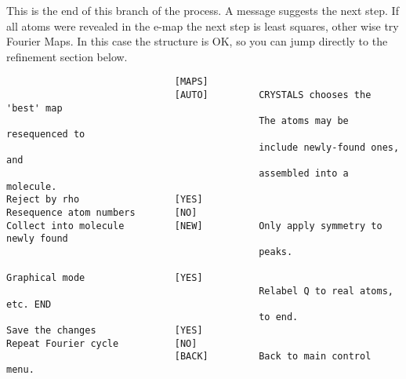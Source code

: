 \documentclass[10pt,a4paper]{report}
\begin{document}
This is the end of this branch of the process. A message suggests the next step.
If all atoms were revealed in the e-map the next step is least squares, other
wise try Fourier Maps. In this case the structure is OK, so you can jump
directly to the refinement section below.
\small\begin{verbatim}
                              [MAPS]
                              [AUTO]         CRYSTALS chooses the 'best' map
                                             The atoms may be resequenced to
                                             include newly-found ones, and
                                             assembled into a molecule.
Reject by rho                 [YES]
Resequence atom numbers       [NO]
Collect into molecule         [NEW]          Only apply symmetry to newly found
                                             peaks.

Graphical mode                [YES]
                                             Relabel Q to real atoms, etc. END
                                             to end.
Save the changes              [YES]
Repeat Fourier cycle          [NO]
                              [BACK]         Back to main control menu.
\end{verbatim}\normalsize
\end{document}
